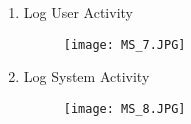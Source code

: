 \documentclass{article}
\begin{document}
\begin{enumerate}
\begin{enumerate}
                    \item{Log User Activity}
                    \begin{figure}[H]
                    	\centering
                        \texttt{[image: MS\_7.JPG]}
                        \newline
                        \newline
                    \end{figure}
                    
                    \item{Log System Activity}
                    \begin{figure}[H]
                    	\centering
                        \texttt{[image: MS\_8.JPG]}
                        \newline
                        \newline
                    \end{figure}
                    
            	\end{enumerate}
                
        \end{enumerate}
\end{document}
